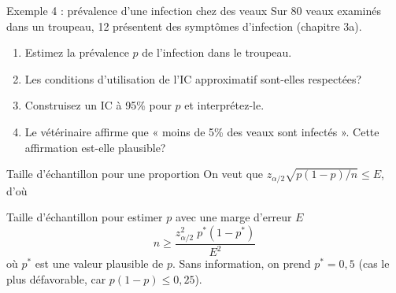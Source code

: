 \documentclass{BeamerTemplate}
\begin{document}
\begin{frame}[t]{Exemple 4 : prévalence d'une infection chez des veaux}
  Sur 80 veaux examinés dans un troupeau, 12 présentent des symptômes d'infection (chapitre 3a).

  \bigskip
  \begin{enumerate}\itemsep 5mm
    \item Estimez la prévalence $p$ de l'infection dans le troupeau.
    \item Les conditions d'utilisation de l'IC approximatif sont-elles respectées?
    \item Construisez un IC à 95\% pour $p$ et interprétez-le.
    \item Le vétérinaire affirme que « moins de 5\% des veaux sont infectés ». Cette affirmation est-elle plausible?
  \end{enumerate}

  \bigskip
\end{frame}

\begin{frame}[t]{Taille d'échantillon pour une proportion}
  On veut que $z_{\alpha/2}\sqrt{p(1-p)/n} \le E$, d'où
  \begin{Boite}{Taille d'échantillon pour estimer $p$ avec une marge d'erreur $E$}
    $$n \ge \frac{z_{\alpha/2}^2\; p^*(1-p^*)}{E^2}$$
    où $p^*$ est une valeur plausible de $p$. \alert{Sans information}, on prend $p^* = 0{,}5$ (cas le plus défavorable, car $p(1-p) \le 0{,}25$).
  \end{Boite}

  \vspace{-1mm}
\end{frame}
\end{document}
